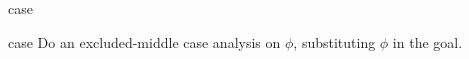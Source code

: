 \begin{tactic}{case}
  \begin{tsyntax}[empty]{case}
  Do an excluded-middle case analysis on $\phi$, substituting $\phi$
  in the goal.
  \end{tsyntax}

\end{tactic}
